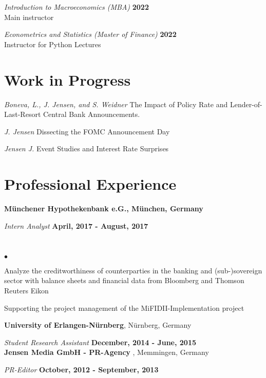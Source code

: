 \documentclass[margin,line]{res}
\newenvironment{list2}{
  \begin{list}{$\bullet$}{%
      \setlength{\itemsep}{0in}
      \setlength{\parsep}{0in} \setlength{\parskip}{0in}
      \setlength{\topsep}{0in} \setlength{\partopsep}{0in} 
      \setlength{\leftmargin}{0.2in}}}{\end{list}}
\begin{document}
\begin{resume}
\vspace{-.3cm}
{\em Introduction to Macroeconomics (MBA)} \hfill {\bf 2022}\\
Main instructor

{\em Econometrics and Statistics (Master of Finance)} \hfill {\bf 2022}\\
Instructor for Python Lectures



\section{\sc Work in Progress}

{\em Boneva, L., J. Jensen, and S. Weidner}   The Impact of Policy Rate and Lender-of-Last-Resort Central Bank Announcements.

{\em J. Jensen}  Dissecting the FOMC Announcement Day

{\em Jensen J.}  Event Studies and Interest Rate Surprises



\section{\sc Professional Experience}
{\bf M\"unchener Hypothekenbank e.G., M\"unchen, Germany

\vspace{-.3cm}
{\em Intern Analyst} \hfill {\bf April, 2017 - August, 2017}}\\
\begin{list2}
  \item Analyze the creditworthiness of counterparties in the banking and (sub-)sovereign sector with balance sheets and financial data from Bloomberg and Thomson Reuters Eikon
  \item Supporting the project management of the MiFIDII-Implementation project
\end{list2}


{\bf University of Erlangen-N\"urnberg}, N\"urnberg, Germany

\vspace{-.3cm}
{\em Student Research Assistant} \hfill {\bf
  December, 2014 - June, 2015}\\

{\bf Jensen Media GmbH - PR-Agency }, Memmingen, Germany

  \vspace{-.3cm}
  {\em PR-Editor} \hfill {\bf
    October, 2012 - September, 2013}\\  


\end{resume}
\end{document}

